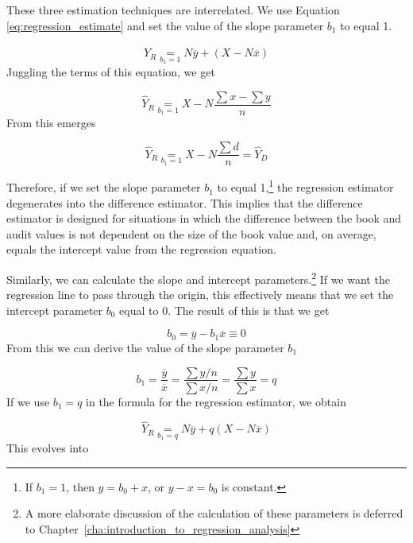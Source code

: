 These three estimation techniques are interrelated. We use Equation \ref{eq:regression_estimate} and set the value of the slope parameter $b_1$ to equal 1.

\begin{equation*}
  \hat{Y}_R \underset{b_1 = 1}{=} N \overline{y} + (X - N \overline{x})
\end{equation*}
Juggling the terms of this equation, we get

\begin{equation*}
  \hat{Y}_R \underset{b_1 = 1}{=} X - N \frac{\sum{x} - \sum{y}}{n}
\end{equation*}
From this emerges

\begin{equation*}
  \hat{Y}_R \underset{b_1 = 1}{=} X - N \frac{\sum{d}}{n} = \hat{Y}_D
\end{equation*}

Therefore, if we set the slope parameter $b_1$ to equal 1,\footnote{If $b_1 = 1$, then $y = b_0 + x$, or $y - x = b_0$ is constant.} the regression estimator degenerates into the difference estimator. This implies that the difference estimator is designed for situations in which the difference between the book and audit values is not dependent on the size of the book value and, on average, equals the intercept value from the regression equation.

Similarly, we can calculate the slope and intercept parameters.\footnote{A more elaborate discussion of the calculation of these parameters is deferred to Chapter~\ref{cha:introduction_to_regression_analysis}} If we want the regression line to pass through the origin, this effectively means that we set the intercept parameter $b_0$ equal to 0. The result of this is that we get

\begin{equation*}
b_0 = \overline{y} - b_1 \overline{x} \equiv 0
\end{equation*}
From this we can derive the value of the slope parameter $b_1$

\begin{equation*}
b_1 = \frac{\overline{y}}{\overline{x}} = \frac{\sum{y}/n}{\sum{x}/n} =\frac{\sum{y}}{\sum{x}} = q
\end{equation*}
If we use $b_1 = q$ in the formula for the regression estimator, we obtain

\begin{equation*}
  \hat{Y}_R \underset{b_1 = q}{=} N \overline{y} + q(X - N \overline{x})
\end{equation*}
This evolves into

